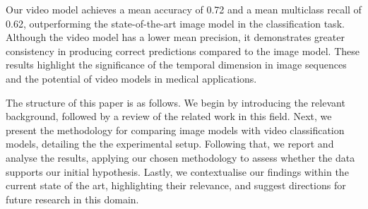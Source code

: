 Our video model achieves a mean accuracy of 0.72 and a mean multiclass recall of 0.62, outperforming the state-of-the-art image model in the classification task. Although the video model has a lower mean precision, it demonstrates greater consistency in producing correct predictions compared to the image model. These results highlight the significance of the temporal dimension in image sequences and the potential of video models in medical applications.


The structure of this paper is as follows. We begin by introducing the relevant background, followed by a review of the related work in this field. Next, we present the methodology for comparing image models with video classification models, detailing the the experimental setup. Following that, we report and analyse the results, applying our chosen methodology to assess whether the data supports our initial hypothesis. Lastly, we contextualise our findings within the current state of the art, highlighting their relevance, and suggest directions for future research in this domain.